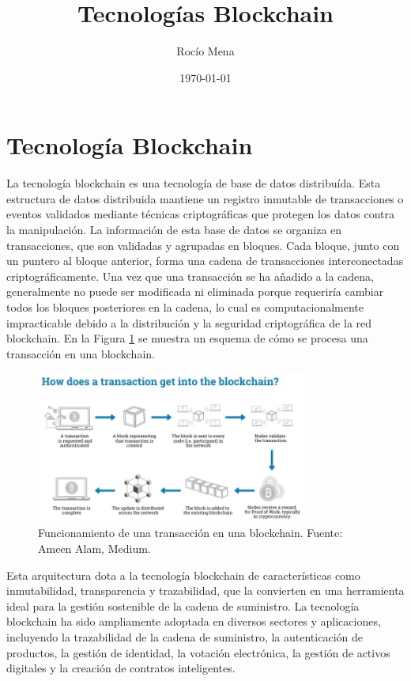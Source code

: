 \documentclass[theoretical-framework.tex]{subfiles}
\title{Tecnologías Blockchain}
\author{Rocío Mena}
\date{\today}
\begin{document}
\section{Tecnología Blockchain}

La tecnología blockchain es una tecnología de base de datos distribuída. Esta estructura de datos distribuida mantiene un registro inmutable de transacciones o eventos validados mediante técnicas criptográficas que protegen los datos contra la manipulación. La información de esta base de datos se organiza en transacciones, que son validadas y agrupadas en bloques. Cada bloque, junto con un puntero al bloque anterior, forma una cadena de transacciones interconectadas criptográficamente. Una vez que una transacción se ha añadido a la cadena, generalmente no puede ser modificada ni eliminada porque requeriría cambiar todos los bloques posteriores en la cadena, lo cual es computacionalmente impracticable debido a la distribución y la seguridad criptográfica de la red blockchain. En la Figura \ref{fig:blockchain} se muestra un esquema de cómo se procesa una transacción en una blockchain.

\begin{figure}[h]
	\centering
	\includegraphics[width=0.8\textwidth]{./assets/blockchain.jpg}
	\caption{Funcionamiento de una transacción en una blockchain. Fuente: Ameen Alam, Medium.}
	\label{fig:blockchain}
\end{figure}

Esta arquitectura dota a la tecnología blockchain de características como inmutabilidad, transparencia y trazabilidad, que la convierten en una herramienta ideal para la gestión sostenible de la cadena de suministro. La tecnología blockchain ha sido ampliamente adoptada en diversos sectores y aplicaciones, incluyendo la trazabilidad de la cadena de suministro, la autenticación de productos, la gestión de identidad, la votación electrónica, la gestión de activos digitales y la creación de contratos inteligentes.
\end{document}
